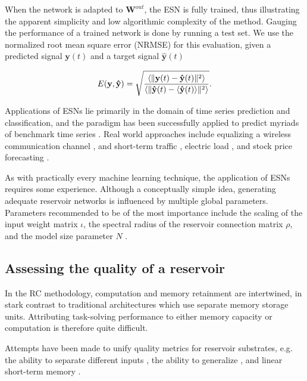 When the network is adapted to $\mathbf{W}^{out}$, the ESN is fully trained,
thus illustrating the apparent simplicity and low algorithmic complexity of the
method. Gauging the performance of a trained network is done by running a test
set. We use the normalized root mean square error (NRMSE) for this evaluation,
given a predicted signal $\mathbf{y}(t)$ and a target signal
$\mathbf{\hat{y}}(t)$

\begin{equation}
  E(\mathbf{y}, \mathbf{\hat{y}}) = \sqrt{\frac{
      \langle\Vert \mathbf{y}(t) - \mathbf{\hat{y}}(t) \Vert^{2}\rangle
    }{
      \langle\Vert \mathbf{\hat{y}}(t) - \langle\mathbf{\hat{y}}(t)\rangle \Vert^{2}\rangle
    }
  }
  .
  \label{nrmse}
\end{equation}


Applications of ESNs lie primarily in the domain of time series prediction and
classification, and the paradigm has been successfully applied to predict
myriads of benchmark time series \cite{goudarzi_comparative_2014,
alippi_quantification_2009, rodan_minimum_2011}. Real world approaches include
equalizing a wireless communication channel \cite{jaeger_harnessing_2004}, and
short-term traffic \cite{an_short-term_2011}, electric load
\cite{song_hourly_2011}, and stock price forecasting \cite{lin_short-term_2009}.

As with practically every machine learning technique, the application of ESNs
requires some experience. Although a conceptually simple idea, generating
adequate reservoir networks is influenced by multiple global
parameters. Parameters recommended to be of the most importance include the
scaling of the input weight matrix $\iota$, the spectral radius of the reservoir
connection matrix $\rho$, and the model size parameter $N$
\cite{montavon_practical_2012, jaeger_tutorial_nodate}.

\subsection{Assessing the quality of a reservoir}

In the RC methodology, computation and memory retainment are intertwined, in
stark contrast to traditional architectures which use separate memory storage
units. Attributing task-solving performance to either memory capacity or
computation is therefore quite difficult.

Attempts have been made to unify quality metrics for reservoir substrates,
e.g. the ability to separate different inputs \cite{legenstein_edge_2007}, the
ability to generalize \cite{legenstein_edge_2007}, and linear short-term memory
\cite{jaeger_short_2002}.

